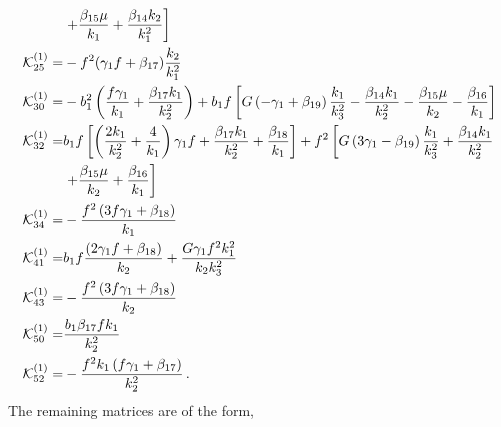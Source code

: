 \begin{align}
 &\left. + \frac{\beta_{15} \mu}{k_{1}}+\frac{\beta_{14} k_{2} }{k_{1}^{2}}\right]
 \\ \mathcal{K}^{(1)}_{25}=& -f^2(\gamma_1f+\beta_{17})\frac{k_{2} }{k_{1}^{2}}
 \\ \mathcal{K}^{(1)}_{30}=& - b_{1}^{2}\left(\frac{f \gamma_{1}}{k_{1}}+\frac{\beta_{17} k_{1} }{k_{2}^{2}}\right)+b_{1}f\left[G\left(- \gamma_{1}+\beta_{19}\right)  \frac{k_{1} }{k_{3}^{2}}-\frac{\beta_{14} k_{1}}{k_{2}^{2}}-\frac{\beta_{15} \mu}{k_{2}}-\frac{\beta_{16}}{k_{1}}\right] 
 \\ \mathcal{K}^{(1)}_{32}=& b_{1}f\left[\left(\frac{2 k_{1}}{k_{2}^{2}}+\frac{4}{k_{1}}\right) \gamma_{1} f+\frac{ \beta_{17} k_{1}}{k_{2}^{2}}+\frac{\beta_{18}}{k_{1}}\right] +f^2\left[G\left(3 \gamma_{1}- \beta_{19}\right) \frac{k_{1} }{k_{3}^{2}}+\frac{\beta_{14} k_{1}}{k_{2}^{2}} \right. \nonumber \\
 &\left. + \frac{\beta_{15} \mu}{k_{2}}+\frac{\beta_{16}}{k_{1}}\right]
 \\ \mathcal{K}^{(1)}_{34}=& -\frac{f^{2}\left(3 f \gamma_{1}+\beta_{18}\right)}{k_{1}}
 \\ \mathcal{K}^{(1)}_{41}=& b_{1}f\frac{\left(2 \gamma_{1} f+ \beta_{18}\right)}{k_{2}} +\frac{G \gamma_{1} f^{2} k_{1}^{2} }{k_{2} k_{3}^{2}}
 \\ \mathcal{K}^{(1)}_{43}=&-\frac{f^{2}\left(3 f \gamma_{1}+\beta_{18}\right)}{k_{2}}
 \\ \mathcal{K}^{(1)}_{50}=& \frac{b_1 \beta_{17} f k_1}{k_2^2}
 \\ \mathcal{K}^{(1)}_{52}=&-\frac{f^{2} k_{1}\left(f \gamma_{1}+\beta_{17}\right)}{k_{2}^{2}}\,.
\end{align}
The remaining matrices are of the form,

